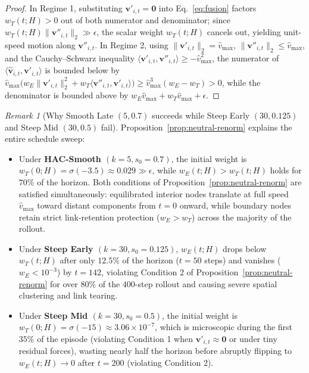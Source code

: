 \documentclass[11pt]{article}
\theoremstyle{plain}
\theoremstyle{definition}
\theoremstyle{remark}
\newtheorem{remark}{Remark}
\begin{document}
\begin{proof}
In Regime 1, substituting $\mathbf{v}'_{i,t} = \mathbf{0}$ into Eq.~\eqref{eq:fusion} factors $w_T(t; H) > 0$ out of both numerator and denominator; since $w_T(t; H)\|\mathbf{v}''_{i,t}\|_2 \gg \epsilon$, the scalar weight $w_T(t; H)$ cancels out, yielding unit-speed motion along $\mathbf{v}''_{i,t}$. In Regime 2, using $\|\mathbf{v}'_{i,t}\|_2 = \hat{v}_{\max}$, $\|\mathbf{v}''_{i,t}\|_2 \le \hat{v}_{\max}$, and the Cauchy--Schwarz inequality $\langle \mathbf{v}'_{i,t}, \mathbf{v}''_{i,t} \rangle \ge -\hat{v}_{\max}^2$, the numerator of $\langle \hat{\mathbf{v}}_{i,t}, \mathbf{v}'_{i,t} \rangle$ is bounded below by $\hat{v}_{\max}\bigl(w_E\|\mathbf{v}'_{i,t}\|_2^2 + w_T\langle \mathbf{v}''_{i,t}, \mathbf{v}'_{i,t}\rangle\bigr) \ge \hat{v}_{\max}^3(w_E - w_T) > 0$, while the denominator is bounded above by $w_E\hat{v}_{\max} + w_T\hat{v}_{\max} + \epsilon$.
\end{proof}

\begin{remark}[Why Smooth Late $(5, 0.7)$ succeeds while Steep Early $(30, 0.125)$ and Steep Mid $(30, 0.5)$ fail]
Proposition~\ref{prop:neutral-renorm} explains the entire schedule sweep:
\begin{itemize}[nosep]
  \item Under \textbf{HAC-Smooth $(k=5, s_0=0.7)$}, the initial weight is $w_T(0; H) = \sigma(-3.5) \approx 0.029 \gg \epsilon$, while $w_E(t; H) > w_T(t; H)$ holds for $70\%$ of the horizon. Both conditions of Proposition~\ref{prop:neutral-renorm} are satisfied simultaneously: equilibrated interior nodes translate at full speed $\hat{v}_{\max}$ toward distant components from $t=0$ onward, while boundary nodes retain strict link-retention protection ($w_E > w_T$) across the majority of the rollout.
  \item Under \textbf{Steep Early $(k=30, s_0=0.125)$}, $w_E(t; H)$ drops below $w_T(t; H)$ after only $12.5\%$ of the horizon ($t = 50$ steps) and vanishes ($w_E < 10^{-3}$) by $t = 142$, violating Condition 2 of Proposition~\ref{prop:neutral-renorm} for over $80\%$ of the $400$-step rollout and causing severe spatial clustering and link tearing.
  \item Under \textbf{Steep Mid $(k=30, s_0=0.5)$}, the initial weight is $w_T(0; H) = \sigma(-15) \approx 3.06 \times 10^{-7}$, which is microscopic during the first $35\%$ of the episode (violating Condition 1 when $\mathbf{v}'_{i,t} \approx \mathbf{0}$ or under tiny residual forces), wasting nearly half the horizon before abruptly flipping to $w_E(t; H) \to 0$ after $t = 200$ (violating Condition 2).
\end{itemize}
\end{remark}
\end{document}
